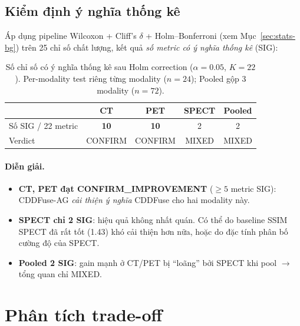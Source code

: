 \subsection{Kiểm định ý nghĩa thống kê}
\label{ssec:stats-results}

Áp dụng pipeline Wilcoxon + Cliff's $\delta$ + Holm--Bonferroni (xem Mục~\ref{sec:stats-bg}) trên 25 chỉ số chất lượng, kết quả \emph{số metric có ý nghĩa thống kê} (SIG):

\begin{table}[h]
\centering
\small
\caption{Số chỉ số có ý nghĩa thống kê sau Holm correction ($\alpha = 0.05$, $K = 22$). Per-modality test riêng từng modality ($n = 24$); Pooled gộp 3 modality ($n = 72$).}
\label{tab:cddfuse-ag-sig}
\begin{tabular}{lcccc}
\toprule
& \textbf{CT} & \textbf{PET} & \textbf{SPECT} & \textbf{Pooled} \\
\midrule
Số SIG / 22 metric & \textbf{10} & \textbf{10} & 2 & 2 \\
Verdict           & CONFIRM    & CONFIRM    & MIXED & MIXED \\
\bottomrule
\end{tabular}
\end{table}

\paragraph{Diễn giải.}
\begin{itemize}\itemsep0pt
    \item \textbf{CT, PET đạt CONFIRM\_IMPROVEMENT} ($\ge 5$ metric SIG): CDDFuse-AG \emph{cải thiện ý nghĩa} CDDFuse cho hai modality này.
    \item \textbf{SPECT chỉ 2 SIG}: hiệu quả không nhất quán. Có thể do baseline SSIM SPECT đã rất tốt (1.43) khó cải thiện hơn nữa, hoặc do đặc tính phân bố cường độ của SPECT.
    \item \textbf{Pooled 2 SIG}: gain mạnh ở CT/PET bị ``loãng'' bởi SPECT khi pool $\to$ tổng quan chỉ MIXED.
\end{itemize}

\section{Phân tích trade-off}
\label{sec:results-tradeoff}

